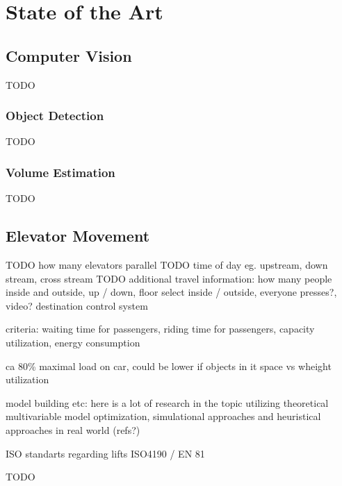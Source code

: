 \chapter{State of the Art}
\label{chap:sota}

\section{Computer Vision}

TODO

\subsection{Object Detection}

TODO

\subsection{Volume Estimation}

TODO

\section{Elevator Movement}
TODO how many elevators parallel
TODO time of day eg. upstream, down stream, cross stream
TODO additional travel information: how many people inside and outside, up / down, floor select inside / outside, everyone presses?, video? 
destination control system

criteria: waiting time for passengers, riding time for passengers, capacity utilization, energy consumption

ca 80\% maximal load on car, could be lower if objects in it
space vs wheight utilization

model building etc: here is a lot of research in the topic utilizing theoretical multivariable model optimization, simulational approaches and heuristical approaches in real world (refs?)

ISO standarts regarding lifts ISO4190 / EN 81

TODO
